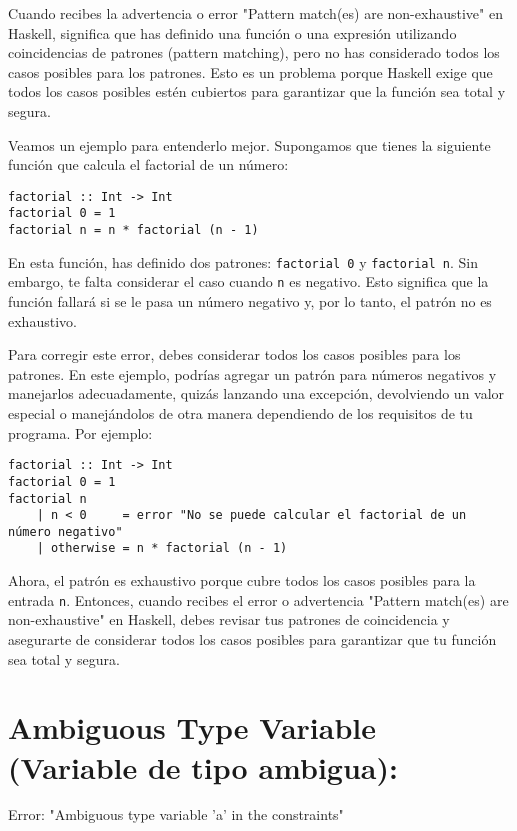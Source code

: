 \documentclass{article}
\begin{document}
Cuando recibes la advertencia o error "Pattern match(es) are non-exhaustive" en Haskell, significa que has definido una función o una expresión utilizando coincidencias de patrones (pattern matching), pero no has considerado todos los casos posibles para los patrones. Esto es un problema porque Haskell exige que todos los casos posibles estén cubiertos para garantizar que la función sea total y segura.

Veamos un ejemplo para entenderlo mejor. Supongamos que tienes la siguiente función que calcula el factorial de un número:

\begin{verbatim}
factorial :: Int -> Int
factorial 0 = 1
factorial n = n * factorial (n - 1)
\end{verbatim}

En esta función, has definido dos patrones: \texttt{factorial 0} y \texttt{factorial n}. Sin embargo, te falta considerar el caso cuando \texttt{n} es negativo. Esto significa que la función fallará si se le pasa un número negativo y, por lo tanto, el patrón no es exhaustivo.

Para corregir este error, debes considerar todos los casos posibles para los patrones. En este ejemplo, podrías agregar un patrón para números negativos y manejarlos adecuadamente, quizás lanzando una excepción, devolviendo un valor especial o manejándolos de otra manera dependiendo de los requisitos de tu programa. Por ejemplo:

\begin{verbatim}
factorial :: Int -> Int
factorial 0 = 1
factorial n
    | n < 0     = error "No se puede calcular el factorial de un número negativo"
    | otherwise = n * factorial (n - 1)
\end{verbatim}

Ahora, el patrón es exhaustivo porque cubre todos los casos posibles para la entrada \texttt{n}. Entonces, cuando recibes el error o advertencia "Pattern match(es) are non-exhaustive" en Haskell, debes revisar tus patrones de coincidencia y asegurarte de considerar todos los casos posibles para garantizar que tu función sea total y segura.

\newpage
\section{Ambiguous Type Variable (Variable de tipo ambigua):}

\begin{mdframed}[backgroundcolor=red!40,shadow=true,shadowsize=2pt,roundcorner=2pt]
    Error: "Ambiguous type variable 'a' in the constraints"
\end{mdframed}
\end{document}
